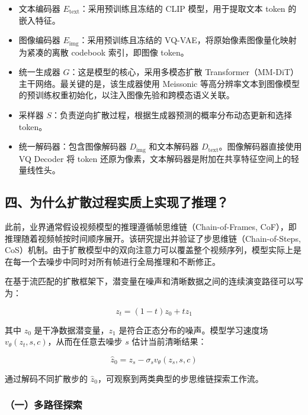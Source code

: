 \begin{itemize}
\tightlist
\item
  文本编码器 \(E_{\mathrm{text}}\)：采用预训练且冻结的 CLIP 模型，用于提取文本 token 的嵌入特征。
\item
  图像编码器 \(E_{\mathrm{img}}\)：采用预训练且冻结的 VQ-VAE，将原始像素图像量化映射为紧凑的离散 codebook 索引，即图像 token。
\item
  统一生成器 \(G\)：这是模型的核心，采用多模态扩散 Transformer（MM-DiT）主干网络。最关键的是，该生成器使用 Meissonic 等高分辨率文本到图像模型的预训练权重初始化，以注入图像先验和跨模态语义关联。
\item
  采样器 \(S\)：负责逆向扩散过程，根据生成器预测的概率分布动态更新和选择 token。
\item
  统一解码器：包含图像解码器 \(D_{\mathrm{img}}\) 和文本解码器 \(D_{\mathrm{text}}\)。图像解码器直接使用 VQ Decoder 将 token 还原为像素，文本解码器是附加在共享特征空间上的轻量线性头。
\end{itemize}

\hypertarget{ux56dbux4e3aux4ec0ux4e48ux6269ux6563ux8fc7ux7a0bux5b9eux8d28ux4e0aux5b9eux73b0ux4e86ux63a8ux7406}{%
\subsection{四、为什么扩散过程实质上实现了推理？}\label{ux56dbux4e3aux4ec0ux4e48ux6269ux6563ux8fc7ux7a0bux5b9eux8d28ux4e0aux5b9eux73b0ux4e86ux63a8ux7406}}

此前，业界通常假设视频模型的推理遵循帧思维链（Chain-of-Frames, CoF），即推理随着视频帧按时间顺序展开。该研究提出并验证了步思维链（Chain-of-Steps, CoS）机制。由于扩散模型中的双向注意力可以覆盖整个视频序列，模型实际上是在每一个去噪步中同时对所有帧进行全局推理和不断修正。

在基于流匹配的扩散框架下，潜变量在噪声和清晰数据之间的连续演变路径可以写为：

\[
z_t=(1-t)z_0+t z_1
\]

其中 \(z_0\) 是干净数据潜变量，\(z_1\) 是符合正态分布的噪声。模型学习速度场 \(v_\theta(z_t,s,c)\)，从而在任意去噪步 \(s\) 估计当前清晰结果：

\[
\hat{z}_0=z_s-\sigma_s v_\theta(z_s,s,c)
\]

通过解码不同扩散步的 \(\hat{z}_0\)，可观察到两类典型的步思维链探索工作流。

\hypertarget{ux4e00ux591aux8defux5f84ux63a2ux7d22}{%
\subsubsection{（一）多路径探索}\label{ux4e00ux591aux8defux5f84ux63a2ux7d22}}

